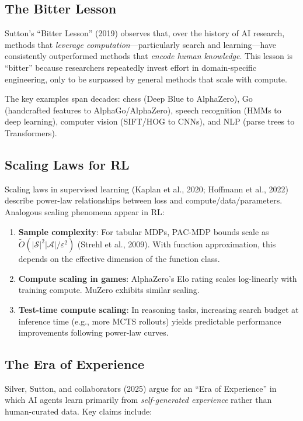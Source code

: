 \documentclass[11pt,a4paper]{article}
\newcommand{\cS}{\mathcal{S}}
\newcommand{\cA}{\mathcal{A}}
\begin{document}
\subsection{The Bitter Lesson}

Sutton's ``Bitter Lesson'' (2019) observes that, over the history of AI research,
methods that \emph{leverage computation}---particularly search and learning---have
consistently outperformed methods that \emph{encode human knowledge}. This lesson
is ``bitter'' because researchers repeatedly invest effort in domain-specific
engineering, only to be surpassed by general methods that scale with compute.

The key examples span decades: chess (Deep Blue to AlphaZero), Go (handcrafted
features to AlphaGo/AlphaZero), speech recognition (HMMs to deep learning),
computer vision (SIFT/HOG to CNNs), and NLP (parse trees to Transformers).

\subsection{Scaling Laws for RL}

Scaling laws in supervised learning (Kaplan et al., 2020; Hoffmann et al., 2022)
describe power-law relationships between loss and compute/data/parameters.
Analogous scaling phenomena appear in RL:

\begin{enumerate}[nosep]
  \item \textbf{Sample complexity}: For tabular MDPs, PAC-MDP bounds scale as
    $\tilde{O}(|\cS|^2|\cA|/\varepsilon^2)$ (Strehl et al., 2009). With function
    approximation, this depends on the effective dimension of the function class.
  \item \textbf{Compute scaling in games}: AlphaZero's Elo rating scales
    log-linearly with training compute. MuZero exhibits similar scaling.
  \item \textbf{Test-time compute scaling}: In reasoning tasks, increasing
    search budget at inference time (e.g., more MCTS rollouts) yields predictable
    performance improvements following power-law curves.
\end{enumerate}

\subsection{The Era of Experience}

Silver, Sutton, and collaborators (2025) argue for an ``Era of Experience''
in which AI agents learn primarily from \emph{self-generated experience}
rather than human-curated data. Key claims include:
\end{document}
